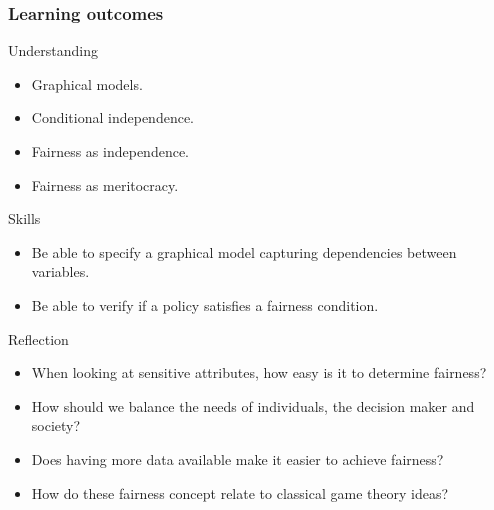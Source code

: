 \begin{frame}
  \frametitle{Learning outcomes}
  \begin{block}{Understanding}
    \begin{itemize}
    \item Graphical models.
    \item Conditional independence.
    \item Fairness as independence.
    \item Fairness as meritocracy.
    \end{itemize}
  \end{block}
  
  \begin{block}{Skills}
    \begin{itemize}
    \item Be able to specify a graphical model capturing dependencies between variables.
    \item Be able to verify if a policy satisfies a fairness condition.
    \end{itemize}
  \end{block}

  \begin{block}{Reflection}
    \begin{itemize}
    \item When looking at sensitive attributes, how easy is it to determine fairness?
    \item How should we balance the needs of individuals, the decision maker and society?
    \item Does having more data available make it easier to achieve fairness?
    \item How do these fairness concept relate to classical game theory ideas?
    \end{itemize}
  \end{block}
  
\end{frame}





